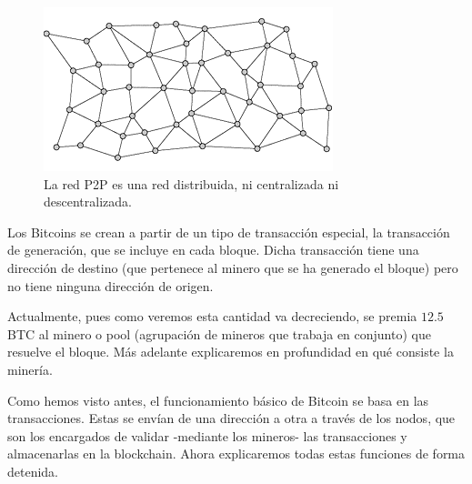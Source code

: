 \documentclass[twoside]{article}
\theoremstyle{definition}
\begin{document}
\begin{figure}[h]
\includegraphics[scale=0.45]{distrib}
\captionsetup{labelformat=empty}
 \caption{La red P2P es una red distribuida, ni centralizada ni descentralizada.}
\end{figure}

Los Bitcoins se crean a partir de un tipo de transacción especial, la transacción de generación, que se incluye en cada bloque. Dicha transacción tiene una dirección de destino (que pertenece al minero que se ha generado el bloque) pero no tiene ninguna dirección de origen. 

Actualmente, pues como veremos esta cantidad va decreciendo, se premia $12.5$ BTC al minero o pool (agrupación de mineros que trabaja en conjunto) que resuelve el bloque. Más adelante explicaremos en profundidad en qué consiste la minería.

Como hemos visto antes, el funcionamiento básico de Bitcoin se basa en las transacciones. Estas se envían de una dirección a otra a través de los nodos, que son los encargados de validar -mediante los mineros- las transacciones y almacenarlas en la blockchain. Ahora explicaremos todas estas funciones de forma detenida.
\end{document}
